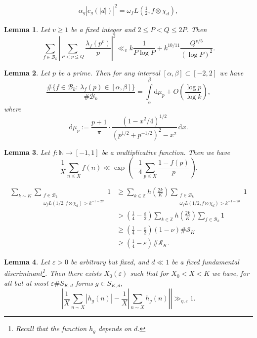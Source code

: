 \documentclass[10pt,a4paper]{amsart}
\newtheorem{lemma}{Lemma}
\newcommand\Z{\mathbb{Z}}
\newcommand\eps{\varepsilon}
\begin{document}
\begin{align}\label{connecting-normalisations}
\alpha_g|c_g(|d|)|^2=\omega_fL\left(\frac12,f\otimes\chi_d\right),
\end{align}

\begin{lemma}\label{large-sieve-2}
Let $v\geq 1$ be a fixed integer and $2\leq P<Q\leq 2P$. Then
\[ 
\sum_{f\in \mathcal B_k}\left|\sum_{P<p\leq Q}\frac{\lambda_f(p^v)}p\right|^2\ll_v k\frac1{P\log P}+k^{10/11}\frac{Q^{v/5}}{(\log P)^2}.\]
\end{lemma}

\begin{lemma}\label{Murty-Sinha}
Let $p$ be a prime. Then for any interval $[\alpha,\beta]\subset[-2,2]$ we have
\[ 
\frac{\#\{f\in \mathcal B_k:\,\lambda_f(p)\in[\alpha,\beta]\}}{\#\mathcal B_k}=\int\limits_\alpha^\beta\mathrm d \mu_p+O\left(\frac{\log p}{\log k}\right),\]
where
\[\mathrm d \mu_p:=\frac{p+1}\pi\cdot\frac{(1-x^2/4)^{1/2}}{\left(p^{1/2}+p^{-1/2}\right)^2-x^2}\,\mathrm d x.\]
\end{lemma}

\begin{lemma}\label{Halasz}
Let $f:\mathbb N\longrightarrow[-1,1]$ be a multiplicative function. Then we have
\[ 
\frac1X\sum_{n\leq X}f(n)\ll \exp\left(-\frac14\sum_{p\leq X}\frac{1-f(p)}p\right).\]
\end{lemma}

\begin{align}\label{non-zero-Fourier-coeff}
\sum_{k\sim K}\sum_{\substack{f\in \mathcal B_k\\
\omega_f L(1/2,f\otimes\chi_d)> k^{-1-2\theta}}}1 &\geq \sum_{k\in\Z}h\left(\frac{2k}K\right)\sum_{\substack{f\in \mathcal B_k \\
\omega_f L(1/2,f\otimes\chi_d)> k^{-1-2\theta}}}1 \nonumber\\
&>\left(\frac1{4}-\frac\eps2\right)\sum_{k\in\Z}h\left(\frac{2k}K\right)\sum_{f\in\mathcal B_k}1 \nonumber\\
&\geq\left(\frac14-\frac\eps2\right)(1-\nu)\#\mathcal S_K \nonumber \\
&\geq \left(\frac14-\eps\right)\#\mathcal S_K.
\end{align}

\begin{lemma}\label{final-key-lemma}
Let $\varepsilon>0$ be arbitrary but fixed, and $d\ll 1$ be a fixed fundamental discriminant\footnote{Recall that the function $h_g$ depends on $d$.}. Then there exists $X_0(\varepsilon)$ such that for $X_0<X<K$ we have, for all but at most $\varepsilon\# S_{K,d}$ forms $g\in S_{K,d}$,
\[ 
\left|\frac1X\sum_{n\sim X}|h_g(n)|-\frac1X\left|\sum_{n\sim X}h_g(n)\right|\right|\gg_{\eta,\varepsilon} 1.\]
\end{lemma} 
\end{document}
